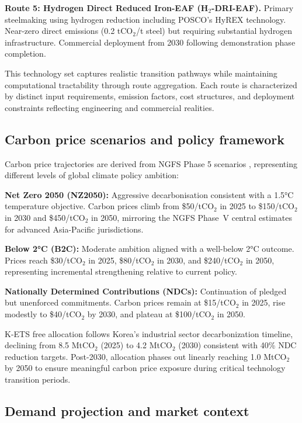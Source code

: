 \documentclass[preprint,1p,authoryear]{elsarticle}
\begin{document}
\textbf{Route 5: Hydrogen Direct Reduced Iron-EAF (H$_2$-DRI-EAF).} Primary steelmaking using hydrogen reduction including POSCO's HyREX technology. Near-zero direct emissions (0.2 tCO$_2$/t steel) but requiring substantial hydrogen infrastructure. Commercial deployment from 2030 following demonstration phase completion.

This technology set captures realistic transition pathways while maintaining computational tractability through route aggregation. Each route is characterized by distinct input requirements, emission factors, cost structures, and deployment constraints reflecting engineering and commercial realities.

\subsection{Carbon price scenarios and policy framework}

Carbon price trajectories are derived from NGFS Phase 5 scenarios \citep{NGFS2024}, representing different levels of global climate policy ambition:

\textbf{Net Zero 2050 (NZ2050):} Aggressive decarbonisation consistent with a 1.5°C temperature objective. Carbon prices climb from \$50/tCO$_2$ in 2025 to \$150/tCO$_2$ in 2030 and \$450/tCO$_2$ in 2050, mirroring the NGFS Phase~V central estimates for advanced Asia-Pacific jurisdictions.

\textbf{Below 2°C (B2C):} Moderate ambition aligned with a well-below 2°C outcome. Prices reach \$30/tCO$_2$ in 2025, \$80/tCO$_2$ in 2030, and \$240/tCO$_2$ in 2050, representing incremental strengthening relative to current policy.

\textbf{Nationally Determined Contributions (NDCs):} Continuation of pledged but unenforced commitments. Carbon prices remain at \$15/tCO$_2$ in 2025, rise modestly to \$40/tCO$_2$ by 2030, and plateau at \$100/tCO$_2$ in 2050.

K-ETS free allocation follows Korea's industrial sector decarbonization timeline, declining from 8.5 MtCO$_2$ (2025) to 4.2 MtCO$_2$ (2030) consistent with 40\% NDC reduction targets. Post-2030, allocation phases out linearly reaching 1.0 MtCO$_2$ by 2050 to ensure meaningful carbon price exposure during critical technology transition periods.

\subsection{Demand projection and market context}
\end{document}
